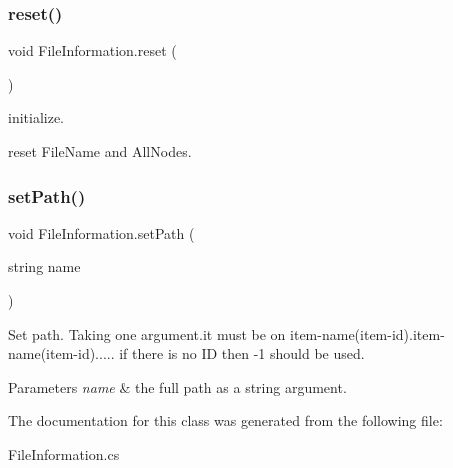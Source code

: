 \subsubsection{\texorpdfstring{reset()}{reset()}}
{\footnotesize\ttfamily void File\+Information.\+reset (\begin{DoxyParamCaption}{ }\end{DoxyParamCaption})\hspace{0.3cm}{\ttfamily [inline]}}



initialize. 

reset File\+Name and All\+Nodes. \mbox{\label{class_file_information_a8ff7c5f71980bfc78f2790d552345f52}} 
\subsubsection{\texorpdfstring{setPath()}{setPath()}}
{\footnotesize\ttfamily void File\+Information.\+set\+Path (\begin{DoxyParamCaption}\item[{string}]{name }\end{DoxyParamCaption})\hspace{0.3cm}{\ttfamily [inline]}}



Set path. Taking one argument.\+it must be on item-\/name(item-\/id).item-\/name(item-\/id)..... if there is no ID then -\/1 should be used. 


\begin{DoxyParams}{Parameters}
{\em name} & the full path as a string argument. \\
\hline
\end{DoxyParams}


The documentation for this class was generated from the following file\+:\begin{DoxyCompactItemize}
\item 
File\+Information.\+cs\end{DoxyCompactItemize}
